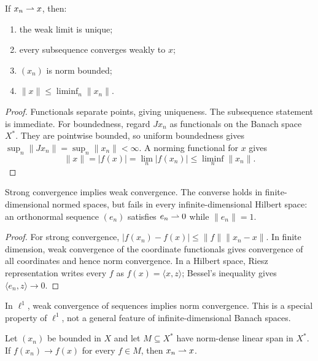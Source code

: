 \begin{notelemma}
If $x_n\rightharpoonup x$, then:
\begin{enumerate}
  \item the weak limit is unique;
  \item every subsequence converges weakly to $x$;
  \item $(x_n)$ is norm bounded;
  \item $\|x\|\le\liminf_n\|x_n\|$.
\end{enumerate}
\end{notelemma}

\begin{proof}
Functionals separate points, giving uniqueness.  The subsequence statement is
immediate.  For boundedness, regard $Jx_n$ as functionals on the Banach space
$X^*$.  They are pointwise bounded, so uniform boundedness gives
$\sup_n\|Jx_n\|=\sup_n\|x_n\|<\infty$.  A norming functional for $x$ gives
\[
  \|x\|=|f(x)|=\lim_n|f(x_n)|
  \le\liminf_n\|x_n\|.
\]
\end{proof}

\begin{notetheorem}
Strong convergence implies weak convergence.  The converse holds in
finite-dimensional normed spaces, but fails in every infinite-dimensional
Hilbert space: an orthonormal sequence $(e_n)$ satisfies $e_n\rightharpoonup0$ while
$\|e_n\|=1$.
\end{notetheorem}

\begin{proof}
For strong convergence,
$|f(x_n)-f(x)|\le\|f\|\|x_n-x\|$.  In finite dimension, weak convergence of
the coordinate functionals gives convergence of all coordinates and hence
norm convergence.  In a Hilbert space, Riesz representation writes every
$f$ as $f(x)=\langle x,z\rangle$; Bessel's inequality gives
$\langle e_n,z\rangle\to0$.
\end{proof}

\begin{noteremark}
In $\ell^1$, weak convergence of sequences implies norm convergence.  This is
a special property of $\ell^1$, not a general feature of infinite-dimensional
Banach spaces.
\end{noteremark}

\begin{notelemma}
Let $(x_n)$ be bounded in $X$ and let $M\subseteq X^*$ have norm-dense linear
span in $X^*$.  If $f(x_n)\to f(x)$ for every $f\in M$, then
$x_n\rightharpoonup x$.
\end{notelemma}

